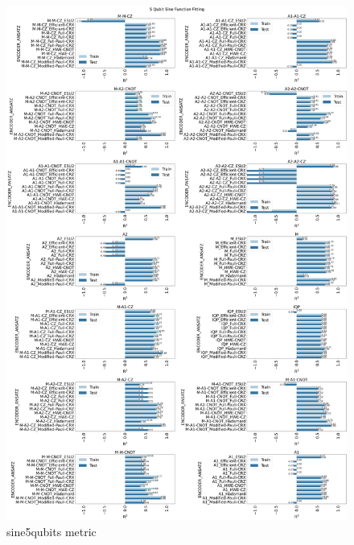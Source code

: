 \documentclass[journal=jacsat,manuscript=article]{achemso}
\begin{document}
\begin{figure}[H]
	\centering
	\includegraphics[width=0.8\linewidth]{images/5qubit_Sine_funcfit_R2.png}
	\caption{sine5qubits metric}
	\label{fig:sine5qubits_metric}
\end{figure}
\end{document}
